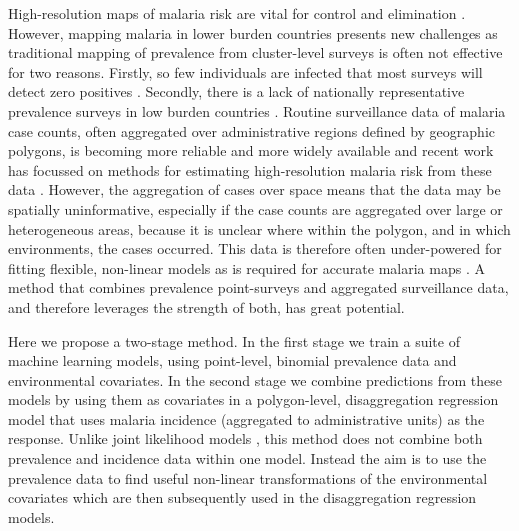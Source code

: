 \documentclass[review]{elsarticle}
\begin{document}






High-resolution maps of malaria risk are vital for control and elimination \citep{weiss2019mapping, battle2019mapping}.
However, mapping malaria in lower burden countries presents new challenges as traditional mapping of prevalence from cluster-level surveys \cite{weiss2019mapping,battle2019mapping, bhatt2017improved, bhatt2015effect} is often not effective for two reasons.
Firstly, so few individuals are infected that most surveys will detect zero positives \citep{sturrock2016mapping}.
Secondly, there is a lack of nationally representative prevalence surveys in low burden countries \citep{sturrock2016mapping, sturrock2014fine}. 
Routine surveillance data of malaria case counts, often aggregated over administrative regions defined by geographic polygons, is becoming more reliable and more widely available \citep{sturrock2016mapping} and recent work has focussed on methods for estimating high-resolution malaria risk from these data \citep{sturrock2014fine, wilson2017pointless, law2018variational, taylor2017continuous, li2012log, johnson2019spatially}. 
However, the aggregation of cases over space means that the data may be spatially uninformative, especially if the case counts are aggregated over large or heterogeneous areas, because it is unclear where within the polygon, and in which environments, the cases occurred. 
This data is therefore often under-powered for fitting flexible, non-linear models as is required for accurate malaria maps \citep{bhatt2017improved, bhatt2015effect}. 
A method that combines prevalence point-surveys and aggregated surveillance data, and therefore leverages the strength of both, has great potential.

Here we propose a two-stage method.
In the first stage we train a suite of machine learning models, using point-level, binomial prevalence data and environmental covariates.
In the second stage we combine predictions from these models by using them as covariates in a polygon-level, disaggregation regression model that uses  malaria incidence (aggregated to administrative units) as the response.
Unlike joint likelihood models \citep{wang2018generalized}, this method does not combine both prevalence and incidence data within one model.
Instead the aim is to use the prevalence data to find useful non-linear transformations of the environmental covariates which are then subsequently used in the disaggregation regression models.
\end{document}
